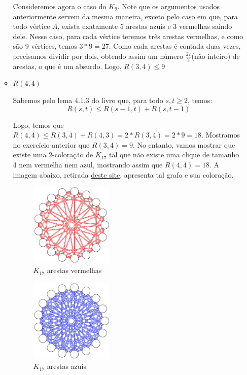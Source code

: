 \documentclass{article}
\begin{document}
\begin{itemize}
\begin{itemize}
				Consideremos agora o caso do \(K_9\). Note que os argumentos usados anteriormente servem da mesma maneira, exceto pelo caso em que, para todo vértice \(A\),
				exista exatamente 5 arestas azuis e 3 vermelhas saindo dele. Nesse caso, para cada vértice teremos três arestas vermelhas, e como são 9 vértices, temos \(3 * 9 = 27\). Como cada arestas
				é contada duas vezes, precisamos dividir por dois, obtendo assim um número \(\frac{27}{2}\)(não inteiro) de arestas, o que é um absurdo. Logo, \(R(3, 4) \leq 9\)

			\item \(R(4, 4)\)

				Sabemos pelo lema 4.1.3 do livro que, para todo \(s, t \geq 2\), temos:
				\[R(s, t) \leq R(s - 1, t) + R(s, t - 1)\]

				Logo, temos que \(R(4, 4) \leq R(3, 4) + R(4, 3) = 2*R(3, 4) = 2*9 = 18\). Mostramos no exercício anterior
				que \(R(3, 4) = 9\).
				No entanto, vamos mostrar que existe uma 2-coloração de \(K_{17}\) tal que não existe uma clique de tamanho 4 nem vermelha nem azul, mostrando assim
				que \(R(4, 4) = 18\). A imagem abaixo, 
				retirada \href{https://www.cut-the-knot.org/arithmetic/combinatorics/Ramsey44.shtml}{deste site}, apresenta tal grafo e sua coloração.

			                  \begin{figure}[H]
				                  \centering
				                  \includegraphics[width=0.4\textwidth]{images/r441.jpeg}
								  \caption{\(K_{17}\) arestas vermelhas}
			                  \end{figure}

			                  \begin{figure}[H]
				                  \centering
				                  \includegraphics[width=0.4\textwidth]{images/r442.jpeg}
								  \caption{\(K_{17}\) arestas azuis}
			                  \end{figure}


\end{itemize}
\end{itemize}
\end{document}
